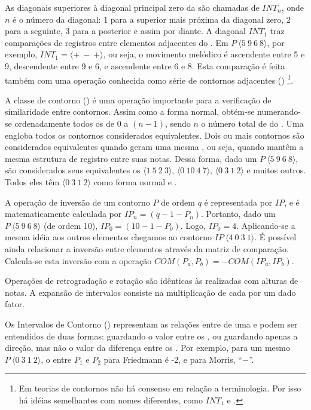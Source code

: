As diagonais superiores à diagonal principal zero da
 são chamadas de $INT_n$, onde $n$ é o número da
diagonal: 1 para a superior mais próxima da diagonal zero, 2 para a
seguinte, 3 para a posterior e assim por diante. A diagonal $INT_1$
traz comparações de registros entre elementos adjacentes do
. Em $P\:\langle5\:9\:6\:8\rangle$, por exemplo,
$INT_1=\langle+\:-\:+\rangle$, ou seja, o movimento melódico é
ascendente entre 5 e 9, descendente entre 9 e 6, e ascendente entre 6
e 8. Esta comparação é feita também com uma operação conhecida como
série de contornos adjacentes () \footnote{Em teorias de
  contornos não há consenso em relação a terminologia. Por isso há
  idéias semelhantes com nomes diferentes, como $INT_1$ e 
  \cite{friedmann87:response}.}.

A classe de contorno () é uma operação importante para a
verificação de similaridade entre contornos. Assim como a forma
normal, obtém-se  numerando-se ordenadamente todos os
 de $0$ a $(n-1)$, sendo $n$ o número total de
 do . Uma  engloba todos os
contornos considerados equivalentes. Dois ou mais contornos são
considerados equivalentes quando geram uma mesma ,
ou seja, quando mantêm a mesma estrutura de registro entre suas
notas. Dessa forma, dado um 
$P\:\langle5\:9\:6\:8\rangle$, são considerados seus equivalentes os
 $\langle1\:5\:2\:3\rangle$, $\langle0\:10\:4\:7\rangle$,
$\langle0\:3\:1\:2\rangle$ e muitos outros. Todos eles têm
$\langle0\:3\:1\:2\rangle$ como forma normal e .

A operação de inversão de um contorno $P$ de ordem $q$ é representada
por $IP$, e é matematicamente calculada por
$IP_n=(q-1-P_n)$. Portanto, dado um 
$P\:\langle5\:9\:6\:8\rangle$ (de ordem 10), $IP_0=(10-1-P_0)$. Logo,
$IP_0=4$. Aplicando-se a mesma idéia aos outros elementos chegamos ao
contorno $IP\:\langle4\:0\:3\:1\rangle$. É possível ainda relacionar a
inversão entre elementos através da matriz de comparação. Calcula-se
esta inversão com a operação $COM(P_a,P_b)=-COM(IP_a,IP_b)$.

Operações de retrogradação e rotação são idênticas às realizadas com
alturas de notas. A expansão de intervalos consiste na multiplicação
de cada  por um dado fator.

Os Intervalos de Contorno () representam as relações entre
 de uma  e podem ser entendidos de duas
formas: guardando o valor entre os 
\cite{friedmann85:methodology}, ou guardando apenas a direção, mas não
o valor da diferença entre os 
\cite{morris93:directions}. Por exemplo, para um mesmo 
$P\:\langle0\:3\:1\:2\rangle$, o  entre $P_1$ e $P_2$ para
Friedmann é -2, e para Morris, ``$-$''.

